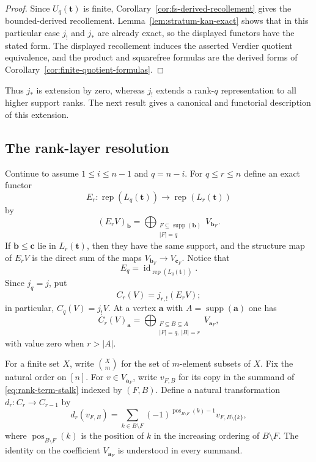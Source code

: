\documentclass[10pt,a4paper]{amsart}
\newcommand{\Rep}{\operatorname{rep}}
\begin{document}
\begin{proof}
Since $U_q(\mathbf t)$ is finite,
Corollary~\ref{cor:fs-derived-recollement} gives the bounded-derived
recollement.  Lemma~\ref{lem:stratum-kan-exact} shows that in this particular
case $j_!$ and $j_*$ are already exact, so the displayed functors have the
stated form.  The displayed recollement induces the asserted Verdier quotient
equivalence, and the product and squarefree formulas are the derived forms of
Corollary~\ref{cor:finite-quotient-formulas}.
\end{proof}

Thus $j_*$ is extension by zero, whereas $j_!$ extends a rank-$q$ representation to all higher support ranks.  The next result gives a canonical and functorial description of this extension.

\subsection{The rank-layer resolution}\label{subsec:rank-resolution}

Continue to assume $1\le i\le n-1$ and $q=n-i$.
For $q\le r\le n$ define an exact functor
\[
E_r:\Rep(L_q(\mathbf t))\longrightarrow\Rep(L_r(\mathbf t))
\]
by
\[
(E_rV)_{\mathbf b}
=
\bigoplus_{\substack{F\subseteq\operatorname{supp}(\mathbf b)\\|F|=q}}
V_{\mathbf b_F}.
\]
If $\mathbf b\le\mathbf c$ lie in $L_r(\mathbf t)$, then they have the same support, and the structure map of $E_rV$ is the direct sum of the maps
$V_{\mathbf b_F}\to V_{\mathbf c_F}$.  Notice that
\[
E_q=\operatorname{id}_{\Rep(L_q(\mathbf t))}.
\]
Since $j_q=j$, put
\[
C_r(V)=j_{r,!}(E_rV);
\]
in particular, $C_q(V)=j_!V$.
At a vertex $\mathbf a$ with $A=\operatorname{supp}(\mathbf a)$ one has
\begin{equation}\label{eq:rank-term-stalk}
C_r(V)_{\mathbf a}
=
\bigoplus_{\substack{F\subseteq B\subseteq A\\|F|=q,\ |B|=r}}
V_{\mathbf a_F},
\end{equation}
with value zero when $r>|A|$.

For a finite set $X$, write $\binom{X}{m}$ for the set of $m$-element
subsets of $X$.
Fix the natural order on $[n]$.  For $v\in V_{\mathbf a_F}$, write
$v_{F,B}$ for its copy in the summand of \eqref{eq:rank-term-stalk} indexed by
$(F,B)$.  Define a natural transformation $d_r:C_r\to C_{r-1}$ by
\begin{equation}\label{eq:rank-differential}
d_r(v_{F,B})
=
\sum_{k\in B\setminus F}
(-1)^{\operatorname{pos}_{B\setminus F}(k)-1}
v_{F,B\setminus\{k\}},
\end{equation}
where $\operatorname{pos}_{B\setminus F}(k)$ is the position of $k$ in the increasing ordering of $B\setminus F$.  The identity on the coefficient $V_{\mathbf a_F}$ is understood in every summand.
\end{document}

